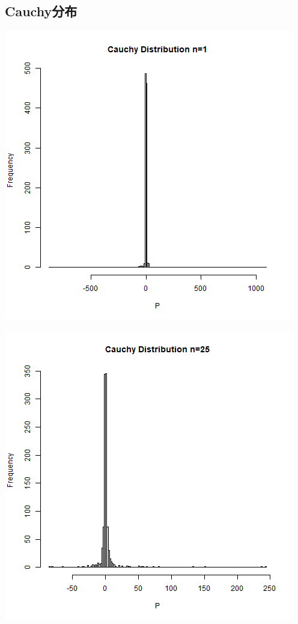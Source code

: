 \documentclass{article}
\begin{document}
\begin{CJK}{UTF8}{gbsn}
\subsection{Cauchy分布}
\begin{minipage}{0.5\textwidth}
    \includegraphics[scale=0.6]{hist3-1.png}
\end{minipage}
\begin{minipage}{0.5\textwidth}
    \includegraphics[scale=0.6]{hist3-2.png}

\end{minipage}
\end{CJK}
\end{document}
